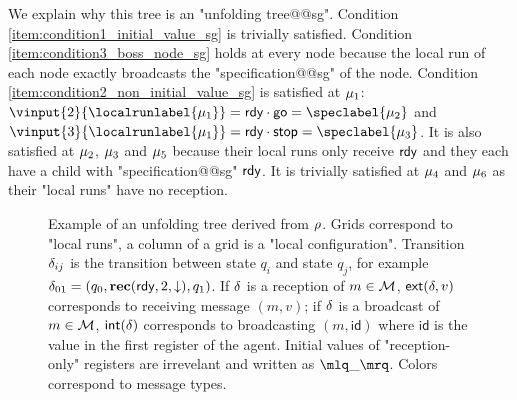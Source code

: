 \begin{example}
	We explain why this tree is an "unfolding tree@@sg". Condition \ref{item:condition1_initial_value_sg} is trivially satisfied. 
	Condition \ref{item:condition3_boss_node_sg} holds at every node because the local run of each node exactly broadcasts the "specification@@sg" of the node. Condition  \ref{item:condition2_non_initial_value_sg} is satisfied at $\mu_1$: $\vinput{2}{\localrunlabel{\node_1}}= \exready \cdot \exgotwo = \speclabel{\node_2}$ and $\vinput{3}{\localrunlabel{\node_1}}= \exready \cdot \exgothree = \speclabel{\node_3}$.
	It is also satisfied at $\mu_2$, $\mu_3$ and $\mu_5$ because their local runs only receive $\textsf{rdy}$ and they each have a child with "specification@@sg" $\textsf{rdy}$. 
	It is trivially satisfied at $\mu_4$ and $\mu_6$ as their "local runs" have no reception. 
\end{example}


\begin{figure}[t]
	\centering
	
	\vspace{-0.5cm}
	\caption{Example of an unfolding tree derived from $\rho$. Grids correspond to "local runs", a column of a grid is a "local configuration". Transition $\delta_{ij}$ is the transition between state $q_i$ and state $q_j$, for example $\delta_{01} = (q_0, \textbf{rec}(\textsf{rdy}, 2, \downarrow), q_1)$. If $\delta$ is a reception of $m\in \mathcal{M}$, $\mathsf{ext}(\delta,v)$ corresponds to receiving message $(m,v)$; if $\delta$ is a broadcast of $m \in \mathcal{M}$, $\mathsf{int}(\delta)$ corresponds to broadcasting $(m,\mathsf{id})$ where $\mathsf{id}$ is the value in the first register of the agent. Initial values of "reception-only" registers are irrevelant and written as $\quotemarks{\_}$. Colors correspond to message types.}
	\label{fig:ex-unfolding-tree-signature}
\end{figure}

